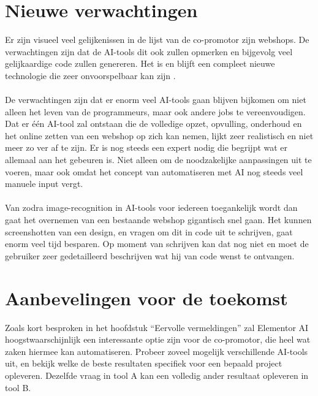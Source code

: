 \section{Nieuwe verwachtingen}
Er zijn visueel veel gelijkenissen in de lijst van de co-promotor zijn webshops. De verwachtingen zijn dat de AI-tools dit ook zullen opmerken en bijgevolg veel gelijkaardige code zullen genereren. Het is en blijft een compleet nieuwe technologie die zeer onvoorspelbaar kan zijn \autocite{KnorrEvans2023}.
\\\\
De verwachtingen zijn dat er enorm veel AI-tools gaan blijven bijkomen om niet alleen het leven van de programmeurs, maar ook andere jobs te vereenvoudigen. Dat er één AI-tool zal ontstaan die de volledige opzet, opvulling, onderhoud en het online zetten van een webshop op zich kan nemen, lijkt zeer realistisch en niet meer zo ver af te zijn. Er is nog steeds een expert nodig die begrijpt wat er allemaal aan het gebeuren is. Niet alleen om de noodzakelijke aanpassingen uit te voeren, maar ook omdat het concept van automatiseren met AI nog steeds veel manuele input vergt. 
\\\\
Van zodra image-recognition in AI-tools voor iedereen toegankelijk wordt dan gaat het overnemen van een bestaande webshop gigantisch snel gaan. Het kunnen screenshotten van een design, en vragen om dit in code uit te schrijven, gaat enorm veel tijd besparen. Op moment van schrijven kan dat nog niet en moet de gebruiker zeer gedetailleerd beschrijven wat hij van code wenst te ontvangen.
\section{Aanbevelingen voor de toekomst}
Zoals kort besproken in het hoofdstuk “Eervolle vermeldingen” zal Elementor AI hoogstwaarschijnlijk een interessante optie zijn voor de co-promotor, die heel wat zaken hiermee kan automatiseren. Probeer zoveel mogelijk verschillende AI-tools uit, en bekijk welke de beste resultaten specifiek voor een bepaald project opleveren. Dezelfde vraag in tool A kan een volledig ander resultaat opleveren in tool B. 

